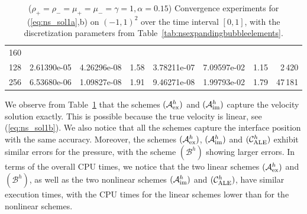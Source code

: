 \documentclass[a4paper,12pt,onecolumn]{article}
\newcommand{\schemeAex}{{\mathcal{A}^h_{\rm ex}}}
\newcommand{\schemeAim}{{\mathcal{A}^h_{\rm im}}}
\newcommand{\schemeB}{{\mathcal{B}^h}}
\newcommand{\schemeALE}{{\mathcal{C}^h_{\rm ALE}}}
\begin{document}
\begin{table}
\begin{tabular}{rllllllr}
160 \\
128 & 2.61390e-05 & 4.26296e-08 & 1.58 & 3.78211e-07 & 7.09597e-02 & 1.15 &
2\,420 \\
256 & 6.53680e-06 & 1.09827e-08 & 1.91 & 9.46271e-08 & 1.99793e-02 & 1.79 &
47\,181 \\
\hline
\end{tabular}
\hspace*{-3.25cm}
\caption[Navier--Stokes expanding bubble I errors]
{($\rho_+ = \rho_- = \mu_+ = \mu_- = \gamma = 1,\alpha=0.15$)
Convergence experiments for (\ref{eq:ns_sol1a},b)
on $(-1,1)^2$ over the time interval $[0,1]$, with the
discretization parameters from Table~\ref{tab:nsexpandingbubbleelements}.}
\label{tab:nsexpandingbubbleIp2p1p0}
\end{table}%
We observe from Table~\ref{tab:nsexpandingbubbleIp2p1p0}
that the schemes $(\schemeAex)$ and $(\schemeAim)$ capture the velocity
solution exactly. This is possible because the true velocity is linear,
see (\ref{eq:ns_sol1b}). We also notice that all the schemes capture the
interface position with the same accuracy. Moreover, the
schemes $(\schemeAex)$, $(\schemeAim)$ and $(\schemeALE)$ exhibit
similar errors for the pressure, with the scheme $(\schemeB)$ showing larger
errors. In terms of the overall CPU times, we notice that
the two linear schemes $(\schemeAex)$ and $(\schemeB)$, as well as the two
nonlinear schemes $(\schemeAim)$ and $(\schemeALE)$, have similar
execution times, with the CPU times for the linear schemes lower than for the
nonlinear schemes.
\end{document}
